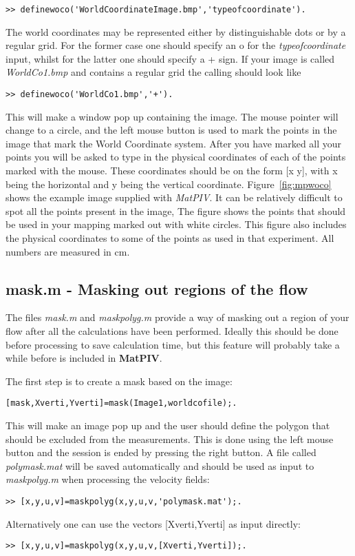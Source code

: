 \documentclass{book}
\begin{document}
\begin{verbatim}
>> definewoco('WorldCoordinateImage.bmp','typeofcoordinate').
\end{verbatim}

The world coordinates may be represented either by distinguishable dots or 
by a regular grid. For the former case one should specify an o for the 
{\it typeofcoordinate} input, whilst for the latter one should specify a + sign.
If your image is called {\it WorldCo1.bmp} and contains a regular grid 
the calling should look like
\begin{verbatim}
>> definewoco('WorldCo1.bmp','+').
\end{verbatim}
This will make a window pop up containing the image. The mouse pointer
will change to a circle, and the left mouse button is used to mark the
points in the image that mark the World Coordinate system. After you
have marked all your points you will be asked to type in the physical
coordinates of each of the points marked with the mouse. These
coordinates should be on the form [x y], with x being the horizontal and
y being the vertical coordinate. Figure~\ref{fig:mpwoco} shows the
example image supplied with {\em MatPIV}. It can be relatively difficult
to spot all the points present in the image, The figure shows the points
that should be used in your mapping marked out with white circles. This
figure also includes the physical coordinates to some of the points as
used in that experiment. All numbers are measured in cm.

\subsection{mask.m - Masking out regions of the flow}

The files {\em mask.m} and {\em maskpolyg.m} provide a way of masking
out a region of your flow after all the calculations have been
performed. Ideally this should be done before processing to save
calculation time, but this feature will probably take a while before
is included in {\bf MatPIV}.

The first step is to create a mask based on the image:
\begin{verbatim}
[mask,Xverti,Yverti]=mask(Image1,worldcofile);.
\end{verbatim}
This will make an image pop up and the user should define the polygon
that should be excluded from the measurements. This is done using the
left mouse button and the session is ended by pressing the right
button. A file called {\em polymask.mat} will be saved automatically
and should be used as input to {\em maskpolyg.m} when processing the
velocity fields:
\begin{verbatim}
>> [x,y,u,v]=maskpolyg(x,y,u,v,'polymask.mat');.
\end{verbatim}
Alternatively one can use the vectors [Xverti,Yverti] as input directly:
\begin{verbatim}
>> [x,y,u,v]=maskpolyg(x,y,u,v,[Xverti,Yverti]);.
\end{verbatim}
\end{document}
